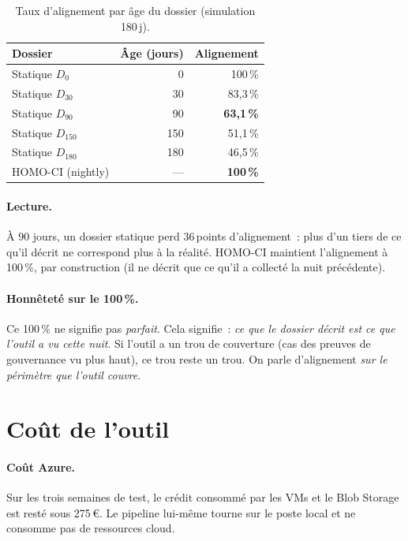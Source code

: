 \begin{table}[h]
\centering
\caption{Taux d'alignement par âge du dossier (simulation 180\,j).}
\label{tab:alignement}
\small
\begin{tabular}{lrr}
\toprule
\textbf{Dossier} & \textbf{Âge (jours)} & \textbf{Alignement} \\
\midrule
Statique $D_0$ & 0 & 100\,\% \\
Statique $D_{30}$ & 30 & 83,3\,\% \\
Statique $D_{90}$ & 90 & \textbf{63,1\,\%} \\
Statique $D_{150}$ & 150 & 51,1\,\% \\
Statique $D_{180}$ & 180 & 46,5\,\% \\
\midrule
HOMO-CI (nightly) & --- & \textbf{100\,\%} \\
\bottomrule
\end{tabular}
\end{table}

\paragraph{Lecture.} À 90 jours, un dossier statique perd
36\,points d'alignement~: plus d'un tiers de ce qu'il décrit ne
correspond plus à la réalité. HOMO-CI maintient l'alignement à
100\,\%, par construction (il ne décrit que ce qu'il a collecté
la nuit précédente).


\paragraph{Honnêteté sur le 100\,\%.} Ce 100\,\% ne signifie pas
\emph{parfait}. Cela signifie~: \emph{ce que le dossier décrit
est ce que l'outil a vu cette nuit}. Si l'outil a un trou de
couverture (cas des preuves de gouvernance vu plus haut), ce trou
reste un trou. On parle d'alignement \emph{sur le périmètre que
l'outil couvre}.

\section{Coût de l'outil}

\paragraph{Coût Azure.} Sur les trois semaines de test, le crédit
consommé par les VMs et le Blob Storage est resté sous
275\,\euro. Le pipeline lui-même tourne sur le poste local et ne
consomme pas de ressources cloud.

